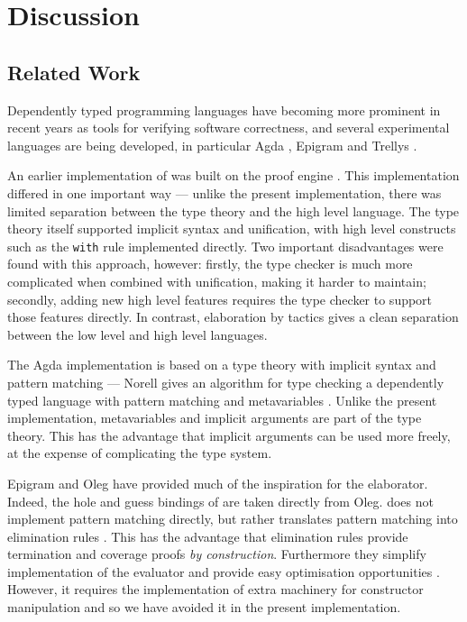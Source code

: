 \section{Discussion}

\label{sect:discussion}


\subsection{Related Work}

Dependently typed programming languages have becoming more prominent in recent
years as tools for verifying software correctness, and several experimental
languages are being developed, in particular Agda \cite{norell2007thesis}, Epigram
\cite{McBride2004a,Levitation2010} and Trellys \cite{Kimmell2012}.

An earlier implementation of \Idris{} was built on the \Ivor{} proof engine 
\cite{Brady2006b}. This implementation differed in one important way --- unlike
the present implementation, there was limited separation between the type theory
and the high level language. The type theory itself supported implicit syntax and
unification, with high level constructs such as the \texttt{with} rule implemented
directly. Two important disadvantages were found with this approach, however: 
firstly, the type checker is much more complicated when combined with
unification, making it harder to maintain; secondly, adding new high level features
requires the type checker to support those features directly. In contrast, elaboration
by tactics gives a clean separation between the low level and high level languages.

The Agda implementation is based on a type theory with
implicit syntax and pattern matching --- Norell gives an algorithm for type checking
a dependently typed language with pattern matching and metavariables 
\cite{norell2007thesis}. Unlike the present \Idris{} implementation, metavariables
and implicit arguments are part of the type theory. This has the advantage that
implicit arguments can be used more freely, at the expense of complicating the type
system.

Epigram \cite{McBride2004a} and Oleg \cite{McBride1999} 
have provided much of the inspiration for the \Idris{} elaborator. Indeed,
the hole and guess bindings of \TTdev{} are taken directly from Oleg.
\Epigram{} does not implement pattern matching directly, but rather translates
pattern matching into elimination rules \cite{McBride2002}. This has the
advantage that
elimination rules provide termination and coverage proofs \emph{by construction}.
Furthermore they simplify implementation of the evaluator and provide easy
optimisation opportunities \cite{Brady2003}. However, it requires the
implementation of extra machinery for constructor manipulation
\cite{McBride2006} and so we have avoided it in the present implementation.

